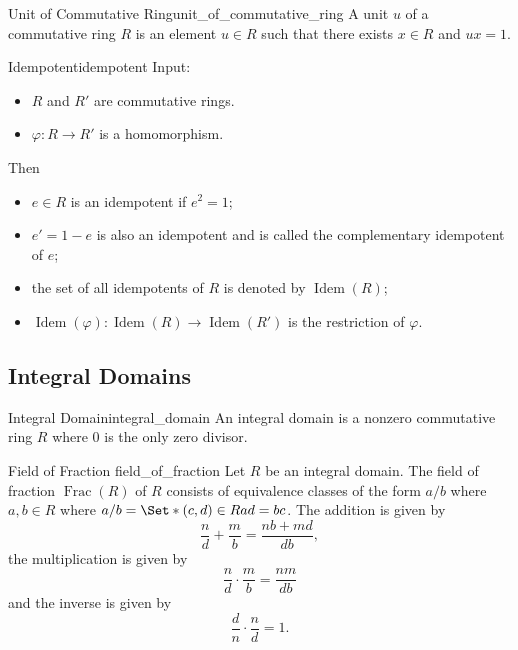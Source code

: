 \documentclass{article}
\begin{document}
\begin{definition}{Unit of Commutative Ring}{unit_of_commutative_ring}
    A unit $u$ of a commutative ring $R$ is an element $u\in R$ such that there exists $x\in R$ and $ux=1$.
\end{definition}

\begin{definition}{Idempotent}{idempotent}
    Input:
    \begin{itemize}
        \item $R$ and $R'$ are commutative rings.
        \item $\varphi: R\rightarrow R'$ is a homomorphism.
    \end{itemize}
    Then
    \begin{itemize}
        \item $e\in R$ is an idempotent if $e^2 = 1$;
        \item $e'=1-e$ is also an idempotent and is called the complementary idempotent of $e$;
        \item the set of all idempotents of $R$ is denoted by $\operatorname{Idem}(R)$;
        \item $\operatorname{Idem}(\varphi): \operatorname{Idem}(R) \rightarrow \operatorname{Idem}(R')$ is the restriction of $\varphi$.
    \end{itemize}
\end{definition}

\subsection{Integral Domains}

\begin{definition}{Integral Domain}{integral_domain}
    An integral domain is a nonzero commutative ring $R$ where $0$ is the only zero divisor.
\end{definition}

\begin{definition}{Field of Fraction }{field_of_fraction}
    Let $R$ be an integral domain.
    The field of fraction $\operatorname{Frac}(R)$ of $R$ consists of equivalence classes of the form $a/b$ where $a,b\in R$ where $a/b = \Set*{(c,d)\in R}{ad=bc}$.
    The addition is given by
    \[ \frac{n}{d} + \frac{m}{b} = \frac{nb + md}{db}, \]
    the multiplication is given by
    \[ \frac{n}{d}\cdot \frac{m}{b} = \frac{nm}{db} \]
    and the inverse is given by
    \[ \frac{d}{n}\cdot \frac{n}{d} = 1. \]
\end{definition}
\end{document}
